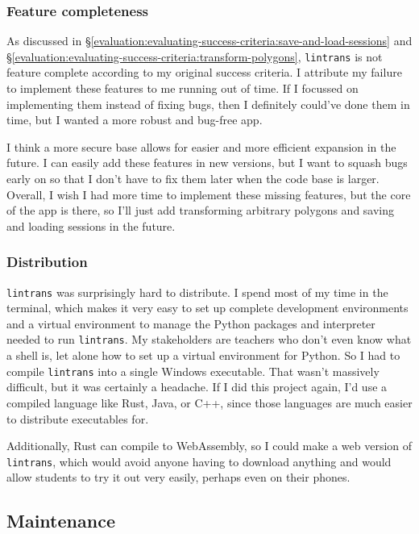 \documentclass[../main.tex]{subfiles}
\begin{document}
\subsubsection{Feature completeness\label{evaluation:limitations:feature-completeness}}

As discussed in \S\ref{evaluation:evaluating-success-criteria:save-and-load-sessions} and \S\ref{evaluation:evaluating-success-criteria:transform-polygons}, \texttt{lintrans} is not feature complete according to my original success criteria. I attribute my failure to implement these features to me running out of time. If I focussed on implementing them instead of fixing bugs, then I definitely could've done them in time, but I wanted a more robust and bug-free app.

I think a more secure base allows for easier and more efficient expansion in the future. I can easily add these features in new versions, but I want to squash bugs early on so that I don't have to fix them later when the code base is larger. Overall, I wish I had more time to implement these missing features, but the core of the app is there, so I'll just add transforming arbitrary polygons and saving and loading sessions in the future.

\subsubsection{Distribution\label{evaluation:limitations:distribution}}

\texttt{lintrans} was surprisingly hard to distribute. I spend most of my time in the terminal, which makes it very easy to set up complete development environments and a virtual environment to manage the Python packages and interpreter needed to run \texttt{lintrans}. My stakeholders are teachers who don't even know what a shell is, let alone how to set up a virtual environment for Python. So I had to compile \texttt{lintrans} into a single Windows executable. That wasn't massively difficult, but it was certainly a headache. If I did this project again, I'd use a compiled language like Rust, Java, or C++, since those languages are much easier to distribute executables for.

Additionally, Rust can compile to WebAssembly\cite{compile-rust-to-wasm}, so I could make a web version of \texttt{lintrans}, which would avoid anyone having to download anything and would allow students to try it out very easily, perhaps even on their phones.

\subsection{Maintenance\label{evaluation:maintenance}}
\end{document}
